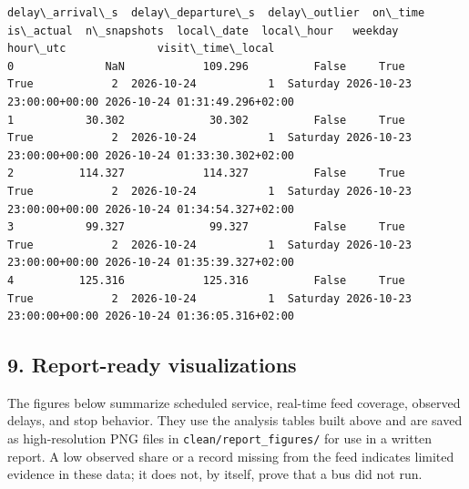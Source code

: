 \documentclass[11pt]{article}
\begin{document}
\begin{Verbatim}[commandchars=\\\{\}]
   delay\_arrival\_s  delay\_departure\_s  delay\_outlier  on\_time  is\_actual  n\_snapshots  local\_date  local\_hour   weekday                  hour\_utc              visit\_time\_local  
0              NaN            109.296          False     True       True            2  2026-10-24           1  Saturday 2026-10-23 23:00:00+00:00 2026-10-24 01:31:49.296+02:00  
1           30.302             30.302          False     True       True            2  2026-10-24           1  Saturday 2026-10-23 23:00:00+00:00 2026-10-24 01:33:30.302+02:00  
2          114.327            114.327          False     True       True            2  2026-10-24           1  Saturday 2026-10-23 23:00:00+00:00 2026-10-24 01:34:54.327+02:00  
3           99.327             99.327          False     True       True            2  2026-10-24           1  Saturday 2026-10-23 23:00:00+00:00 2026-10-24 01:35:39.327+02:00  
4          125.316            125.316          False     True       True            2  2026-10-24           1  Saturday 2026-10-23 23:00:00+00:00 2026-10-24 01:36:05.316+02:00  
    \end{Verbatim}

    
    \subsection{9. Report-ready
visualizations}\label{report-ready-visualizations}

The figures below summarize scheduled service, real-time feed coverage,
observed delays, and stop behavior. They use the analysis tables built
above and are saved as high-resolution PNG files in
\texttt{clean/report\_figures/} for use in a written report. A low
observed share or a record missing from the feed indicates limited
evidence in these data; it does not, by itself, prove that a bus did not
run.
 
            
    
    \begin{center}
    \end{center}
    { \hspace*{\fill} \\}
    

    \begin{center}
    \end{center}
    { \hspace*{\fill} \\}
    
\end{document}
